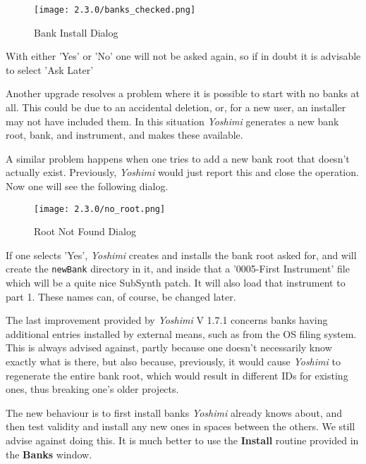 \begin{figure}[H]
   \centering
   \texttt{[image: 2.3.0/banks\_checked.png]}
   \caption{Bank Install Dialog}
   \label{fig:bank_install_dialog}
\end{figure}

   With either 'Yes' or 'No' one will not be asked again, so if in doubt it is
   advisable to select 'Ask Later'

   Another upgrade resolves a problem where it is possible to start with no
   banks at all. This could be due to an accidental deletion, or, for a new
   user, an installer may not have included them. In this situation
   \textsl{Yoshimi} generates a new bank root, bank, and instrument, and makes
   these available.

   A similar problem happens when one tries to add a new bank root that doesn't
   actually exist. Previously, \textsl{Yoshimi} would just report this and close
   the operation. Now one will see the following dialog.

\begin{figure}[H]
   \centering
   \texttt{[image: 2.3.0/no\_root.png]}
   \caption{Root Not Found Dialog}
   \label{fig:no_root_dialog}
\end{figure}

   If one selects 'Yes', \textsl{Yoshimi} creates and installs the bank root
   asked for, and will create the \texttt{newBank} directory
   in it, and inside that a '0005-First Instrument' file which will be a quite
   nice SubSynth patch. It will also load that instrument to part 1.
   These names can, of course, be changed later.

   The last improvement provided by \textsl{Yoshimi} V 1.7.1 concerns banks
   having additional entries installed by external means, such as from the OS
   filing system. This is always advised against, partly because one doesn't
   necessarily know exactly what is there, but also because, previously, it
   would cause \textsl{Yoshimi} to regenerate the entire bank root, which would
   result in different IDs for existing ones, thus breaking one's older
   projects.

   The new behaviour is to first install banks \textsl{Yoshimi} already knows
   about, and then test validity and install any new ones in spaces between the
   others. We still advise against doing this. It is much better to use the
   \textbf{Install} routine provided in the \textbf{Banks} window.

